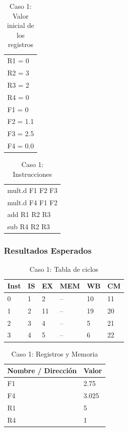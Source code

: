 \documentclass[a4paper]{article}
\begin{document}
	\begin{table}[H]
		\centering
		\caption*{Caso 1: Valor inicial de los registros}
		\begin{tabular}{l}
		R1 = 0 \\
		R2 = 3 \\
		R3 = 2 \\
		R4 = 0 \\
		F1 = 0 \\
		F2 = 1.1 \\
		F3 = 2.5 \\
		F4 = 0.0
		\end{tabular}
	\end{table}

	\begin{table}[H]
		\centering
		\caption*{Caso 1: Instrucciones}
		\begin{tabular}{l}
		mult.d F1 F2 F3 \\
		mult.d F4 F1 F2 \\
		add R1 R2 R3 \\
		sub R4 R2 R3
		\end{tabular}
	\end{table}
	
	\subsubsection*{Resultados Esperados}

	\begin{table}[H]
		\centering
		\caption*{Caso 1: Tabla de ciclos}
		\begin{tabular}{|l|l|l|l|l|l|}
		\hline
		\textbf{Inst} & \textbf{IS} & \textbf{EX} & \textbf{MEM} & \textbf{WB} & \textbf{CM} \\ \hline
		0             & 1           & 2           & --           & 10          & 11          \\ \hline
		1             & 2           & 11          & --           & 19          & 20          \\ \hline
		2             & 3           & 4           & --           & 5           & 21          \\ \hline
		3             & 4           & 5           & --           & 6           & 22          \\ \hline
		\end{tabular}
	\end{table}

	\begin{table}[H]
		\centering
		\caption*{Caso 1: Registros y Memoria}
		\begin{tabular}{|l|l|}
		\hline
		\textbf{Nombre / Dirección} & \textbf{Valor} \\ \hline
		F1                          & 2.75           \\ \hline
		F4                          & 3.025          \\ \hline
		R1                          & 5              \\ \hline
		R4                          & 1              \\ \hline
		\end{tabular}
	\end{table}
\end{document}
